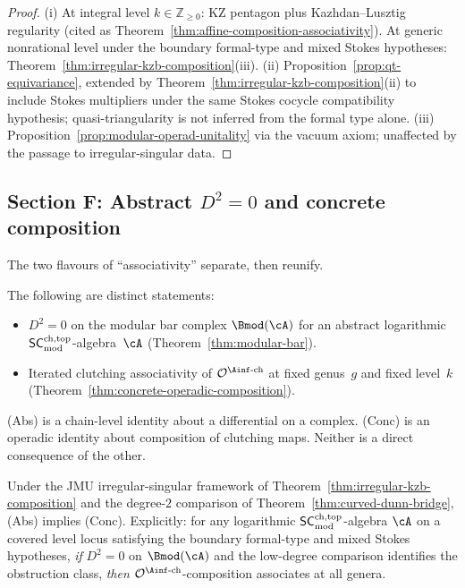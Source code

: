 \begin{proof}
(i) At integral level $k \in \mathbb{Z}_{\ge 0}$: KZ pentagon
plus Kazhdan--Lusztig regularity (cited as
Theorem~\ref{thm:affine-composition-associativity}). At generic
nonrational level under the boundary formal-type and mixed Stokes
hypotheses:
Theorem~\ref{thm:irregular-kzb-composition}(iii).
(ii) Proposition~\ref{prop:qt-equivariance}, extended by
Theorem~\ref{thm:irregular-kzb-composition}(ii) to include Stokes
multipliers under the same Stokes cocycle compatibility hypothesis;
quasi-triangularity is not inferred from the formal type alone.
(iii) Proposition~\ref{prop:modular-operad-unitality} via the vacuum
axiom; unaffected by the passage to irregular-singular data.
\end{proof}

\subsection{Section F: Abstract $D^2 = 0$ and concrete composition}
\label{subsec:abstract-concrete-unification}

The two flavours of ``associativity'' separate, then reunify.

\begin{theorem}
\label{thm:abstract-vs-concrete}
The following are distinct statements:
\begin{itemize}
\item[\textbf{(Abs)}] $D^2 = 0$ on the modular bar complex
 $\Bmod(\cA)$ for an abstract logarithmic $\mathsf{SC}^{\mathrm{ch,top}}_{\mathrm{mod}}$-algebra~$\cA$
 (Theorem~\ref{thm:modular-bar}).
\item[\textbf{(Conc)}] Iterated clutching associativity of
 $\mathcal{O}^{\Ainf\text{-ch}}$ at fixed genus~$g$ and fixed
 level~$k$ (Theorem~\ref{thm:concrete-operadic-composition}).
\end{itemize}
(Abs) is a chain-level identity about a differential on a complex.
(Conc) is an operadic identity about composition of clutching
maps. Neither is a direct consequence of the other.
\end{theorem}

\begin{theorem}
\label{thm:abstract-implies-concrete}
Under the JMU irregular-singular framework of
Theorem~\ref{thm:irregular-kzb-composition} and the degree-\(2\)
comparison of Theorem~\ref{thm:curved-dunn-bridge}, (Abs) implies
(Conc).
Explicitly: for any logarithmic $\mathsf{SC}^{\mathrm{ch,top}}_{\mathrm{mod}}$-algebra $\cA$ on a covered
level locus satisfying the boundary formal-type and mixed Stokes
hypotheses, \emph{if} \(D^2 = 0\) on \(\Bmod(\cA)\) and the
low-degree comparison identifies the obstruction class, \emph{then}
$\mathcal{O}^{\Ainf\text{-ch}}$-composition associates at all genera.
\end{theorem}

